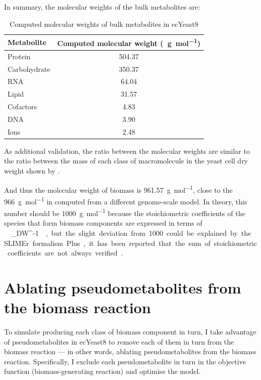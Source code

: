 In summary, the molecular weights of the bulk metabolites are:
\begin{table}[ht]
  \centering
  \begin{tabular}{lS}
    Metabolite & {Computed molecular weight (\SI{}{\gram~\mol^{-1}})} \\
    \hline
    Protein & 504.37 \\
    Carbohydrate & 350.37 \\
    RNA & 64.04 \\
    Lipid & 31.57 \\
    Cofactors & 4.83 \\
    DNA & 3.90 \\
    Ions & 2.48
  \end{tabular}
  \caption{Computed molecular weights of bulk metabolites in ecYeast8}
  \label{tab:ecyeast8-mol-weights}
\end{table}

As additional validation, the ratio between the molecular weights are similar to the ratio between the mass of each class of macromolecule in the yeast cell dry weight shown by \textcite{canelasVivoDatadrivenFramework2011}.

And thus the molecular weight of biomass is \SI{961.57}{\gram~\mol^{-1}}, close to the \SI{966}{\gram~\mol^{-1}} in \textcite{takhaveevTemporalSegregationBiosynthetic2023} computed from a different genome-scale model.
In theory, this number should be \SI{1000}{\gram~\mol^{-1}} because the stoichiometric coefficients of the species that form biomass components are expressed in terms of \SI{}{\milli\mol~\gram_{DW}^{-1}} \parencite{thieleProtocolGeneratingHighquality2010, palssonSystemsBiologyConstraintbased2015}, but the slight deviation from 1000 could be explained by the SLIMEr formalism.
Plus, it has been reported that the sum of stoichiometric coefficients are not always verified \parencite{chanStandardizingBiomassReactions2017}.

\section{Ablating pseudometabolites from the biomass reaction}
\label{sec:model-yeast8-pseudometabolites}

To simulate producing each class of biomass component in turn,
I take advantage of pseudometabolites in ecYeast8 to remove each of them in turn from the biomass reaction ---
in other words, ablating pseudometabolites from the biomass reaction.
Specifically, I exclude each pseudometabolite in turn in the objective function (biomass-generating reaction) and optimise the model.

